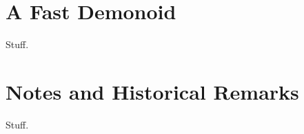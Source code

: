 \section{A Fast Demonoid}\label{sec:fast_demonoid}

Stuff.


\section{Notes and Historical Remarks}\label{sec:universal_construction_history}

Stuff.




